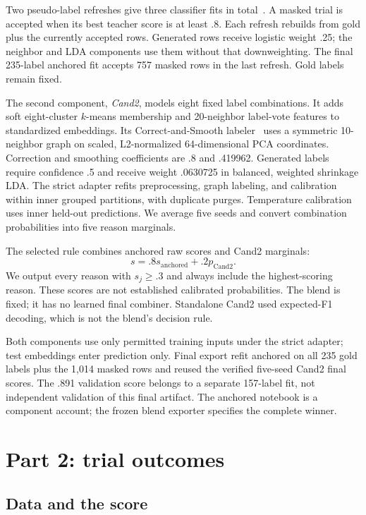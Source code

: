 \documentclass[10pt,twocolumn,letterpaper]{article}
\begin{document}
Two pseudo-label refreshes give three classifier fits in total~\cite{yarowsky1995unsupervised,triguero2015selflabeled}.
A masked trial is accepted when its best teacher score is at least .8. Each
refresh rebuilds from gold plus the currently accepted rows. Generated rows
receive logistic weight .25; the neighbor and LDA components use them without
that downweighting. The final 235-label anchored fit accepts 757 masked rows in
the last refresh. Gold labels remain fixed.

The second component, \emph{Cand2}, models eight fixed label combinations. It
adds soft eight-cluster $k$-means membership and 20-neighbor label-vote features
to standardized embeddings. Its Correct-and-Smooth
labeler~\cite{huang2020correctsmooth} uses a symmetric 10-neighbor graph on
scaled, L2-normalized 64-dimensional PCA coordinates. Correction and smoothing
coefficients are .8 and .419962. Generated labels require confidence .5 and
receive weight .0630725 in balanced, weighted shrinkage LDA. The strict adapter
refits preprocessing, graph labeling, and calibration within inner grouped
partitions, with duplicate purges. Temperature calibration uses inner held-out
predictions. We average five seeds and convert combination probabilities into
five reason marginals.

The selected rule combines anchored raw scores and Cand2 marginals:
\[
s = .8s_{\mathrm{anchored}} + .2p_{\mathrm{Cand2}}.
\]
We output every reason with $s_j\geq .3$ and always include the highest-scoring
reason. These scores are not established calibrated probabilities. The blend
is fixed; it has no learned final combiner. Standalone Cand2 used expected-F1
decoding, which is not the blend's decision rule.

Both components use only permitted training inputs under the strict adapter;
test embeddings enter prediction only. Final export refit anchored on all 235
gold labels plus the 1,014 masked rows and reused the verified five-seed Cand2
final scores. The .891 validation score belongs to a separate 157-label fit,
not independent validation of this final artifact. The anchored notebook is a
component account; the frozen blend exporter specifies the complete winner.

\section{Part 2: trial outcomes}
\label{sec:p2}

\subsection{Data and the score}
\end{document}
